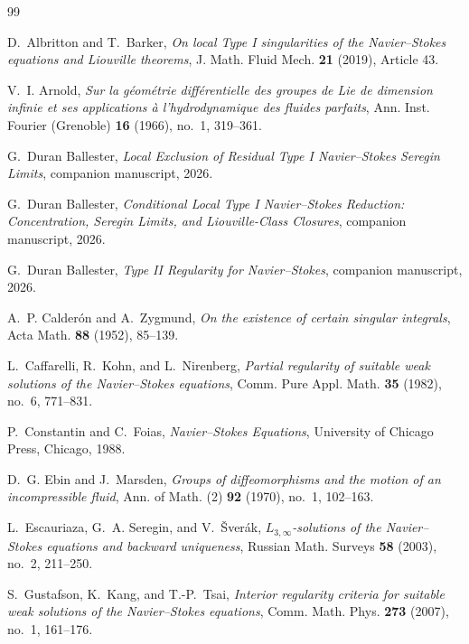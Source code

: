 \documentclass[11pt]{amsart}
\numberwithin{equation}{section}
\theoremstyle{plain}
\theoremstyle{definition}
\theoremstyle{remark}
\begin{document}
\begin{thebibliography}{99}

D.~Albritton and T.~Barker,
\emph{On local Type I singularities of the Navier--Stokes equations and
Liouville theorems},
J. Math. Fluid Mech. \textbf{21} (2019), Article 43.

V.~I. Arnold,
\emph{Sur la g\'eom\'etrie diff\'erentielle des groupes de {L}ie de dimension
infinie et ses applications \`a l'hydrodynamique des fluides parfaits},
Ann. Inst. Fourier (Grenoble) \textbf{16} (1966), no.~1, 319--361.

G.~Duran Ballester,
\emph{Local Exclusion of Residual Type I Navier--Stokes Seregin Limits},
companion manuscript, 2026.

G.~Duran Ballester,
\emph{Conditional Local Type I Navier--Stokes Reduction: Concentration,
Seregin Limits, and Liouville-Class Closures},
companion manuscript, 2026.

G.~Duran Ballester,
\emph{Type II Regularity for Navier--Stokes},
companion manuscript, 2026.

A.~P. Calder\'on and A.~Zygmund,
\emph{On the existence of certain singular integrals},
Acta Math. \textbf{88} (1952), 85--139.

L.~Caffarelli, R.~Kohn, and L.~Nirenberg,
\emph{Partial regularity of suitable weak solutions of the Navier--Stokes
equations},
Comm. Pure Appl. Math. \textbf{35} (1982), no.~6, 771--831.

P.~Constantin and C.~Foias,
\emph{Navier--Stokes Equations},
University of Chicago Press, Chicago, 1988.

D.~G. Ebin and J.~Marsden,
\emph{Groups of diffeomorphisms and the motion of an incompressible fluid},
Ann. of Math. (2) \textbf{92} (1970), no.~1, 102--163.

L.~Escauriaza, G.~A. Seregin, and V.~{\v S}ver\'ak,
\emph{\(L_{3,\infty}\)-solutions of the Navier--Stokes equations and backward
uniqueness},
Russian Math. Surveys \textbf{58} (2003), no.~2, 211--250.

S.~Gustafson, K.~Kang, and T.-P.~Tsai,
\emph{Interior regularity criteria for suitable weak solutions of the
Navier--Stokes equations},
Comm. Math. Phys. \textbf{273} (2007), no.~1, 161--176.


\end{thebibliography}
\end{document}
